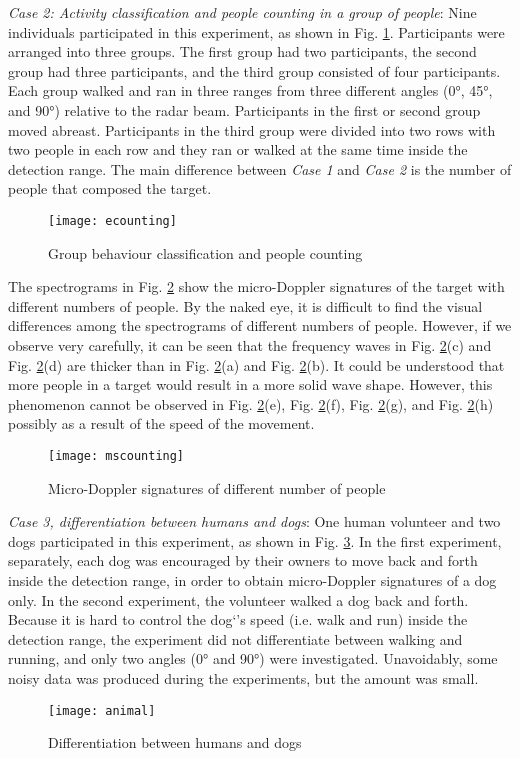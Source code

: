 \textit{Case 2: Activity classification and people counting in a group of people}: Nine individuals participated in this experiment, as shown in Fig. \ref{fig_ec}. Participants were arranged into three groups. The first group had two participants, the second group had three participants, and the third group consisted of four participants. Each group walked and ran in three ranges from three different angles (\ang{0}, \ang{45}, and \ang{90}) relative to the radar beam. Participants in the first or second group moved abreast. Participants in the third group were divided into two rows with two people in each row and they ran or walked at the same time inside the detection range. The main difference between \textit{Case 1} and \textit{Case 2} is the number of people that composed the target.
\begin{figure}[!t]
\centering
\texttt{[image: ecounting]}
\caption{Group behaviour classification and people counting}
\label{fig_ec}
\end{figure}

The spectrograms in Fig. \ref{fig_msc} show the micro-Doppler signatures of the target with different numbers of people. By the naked eye, it is difficult to find the visual differences among the spectrograms of different numbers of people. However, if we observe very carefully, it can be seen that the frequency waves in Fig. \ref{fig_msc}(c) and Fig. \ref{fig_msc}(d) are thicker than in Fig. \ref{fig_msc}(a) and Fig. \ref{fig_msc}(b). It could be understood that more people in a target would result in a more solid wave shape. However, this phenomenon cannot be observed in Fig. \ref{fig_msc}(e), Fig. \ref{fig_msc}(f), Fig. \ref{fig_msc}(g), and Fig. \ref{fig_msc}(h) possibly as a result of the speed of the movement. 
\begin{figure}[!t]
\centering
\texttt{[image: mscounting]}
\caption{Micro-Doppler signatures of different number of people}
\label{fig_msc}
\end{figure}

\textit{Case 3, differentiation between humans and dogs}: One human volunteer and two dogs participated in this experiment, as shown in Fig. \ref{fig_ani}. In the first experiment, separately, each dog was encouraged by their owners to move back and forth inside the detection range, in order to obtain micro-Doppler signatures of a dog only. In the second experiment, the volunteer walked a dog back and forth. Because it is hard to control the dog`’s speed (i.e. walk and run) inside the detection range, the experiment did not differentiate between walking and running, and only two angles (\ang{0} and \ang{90}) were investigated. Unavoidably, some noisy data was produced during the experiments, but the amount was small.  
\begin{figure}[!t]
\centering
\texttt{[image: animal]}
\caption{Differentiation between humans and dogs}
\label{fig_ani}
\end{figure}

